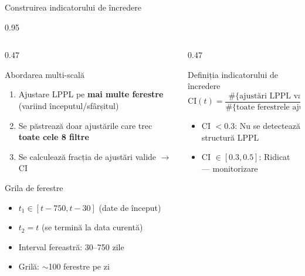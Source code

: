\documentclass[9pt, aspectratio=169, t]{beamer}
\begin{document}
\begin{frame}{Construirea indicatorului de încredere}
    \begin{cminipage}{0.95\textwidth}
    {\scriptsize
    \begin{columns}[T]
        \begin{column}{0.47\textwidth}
            \begin{block}{Abordarea multi-scală}
                \begin{enumerate}\setlength{\itemsep}{0pt}
                    \item Ajustare LPPL pe \textbf{mai multe ferestre} (variind începutul/sfârșitul)
                    \item Se păstrează doar ajustările care trec \textbf{toate cele 8 filtre}
                    \item Se calculează fracția de ajustări valide $\to$ CI
                \end{enumerate}
            \end{block}
            \vspace{-1mm}
            \begin{exampleblock}{Grila de ferestre}
                \begin{itemize}\setlength{\itemsep}{0pt}
                    \item $t_1 \in [t - 750, t - 30]$ (date de început)
                    \item $t_2 = t$ (se termină la data curentă)
                    \item Interval fereastră: 30--750 zile
                    \item Grilă: $\sim$100 ferestre pe zi
                \end{itemize}
            \end{exampleblock}
        \end{column}
        \begin{column}{0.47\textwidth}
            \begin{block}{Definiția indicatorului de încredere}
                \vspace{-2mm}
                $$\text{CI}(t) = \frac{\#\{\text{ajustări LPPL valide la }t\}}{\#\{\text{toate ferestrele ajustate la }t\}}$$
                \vspace{-3mm}
                \begin{itemize}\setlength{\itemsep}{0pt}
                    \item CI $< 0.3$: Nu se detectează structură LPPL
                    \item CI $\in [0.3, 0.5]$: Ridicat --- monitorizare

\end{itemize}
\end{block}
\end{column}
\end{columns}}
\end{cminipage}
\end{frame}
\end{document}
